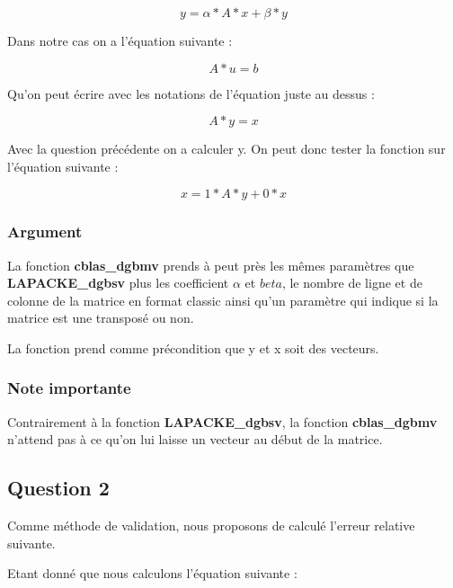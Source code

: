 \documentclass[11pt]{article}
\begin{document}
\begin{equation*}
y = \alpha * A * x + \beta * y
\end{equation*}

Dans notre cas on a l'équation suivante :

\begin{equation*}
A * u = b
\end{equation*}

Qu'on peut écrire avec les notations de l'équation juste au dessus :

\begin{equation*}
A * y = x
\end{equation*}

Avec la question précédente on a calculer y. On peut donc tester la
fonction sur l'équation suivante :

\begin{equation*}
x = 1 * A * y + 0 * x
\end{equation*}

\subsubsection{Argument}

La fonction \textbf{cblas\_dgbmv} prends à peut près les mêmes
paramètres que \textbf{LAPACKE\_dgbsv} plus les coefficient $\alpha$
et $beta$, le nombre de ligne et de colonne de la matrice en format
classic ainsi qu'un paramètre qui indique si la matrice est une
transposé ou non.\newline

La fonction prend comme précondition que y et x soit des vecteurs.

\subsubsection{Note importante}

Contrairement à la fonction \textbf{LAPACKE\_dgbsv}, la fonction
\textbf{cblas\_dgbmv} n'attend pas à ce qu'on lui laisse un vecteur au
début de la matrice.

\subsection{Question 2}

Comme méthode de validation, nous proposons de calculé l'erreur
relative suivante.\newline

Etant donné que nous calculons l'équation suivante :
\end{document}
